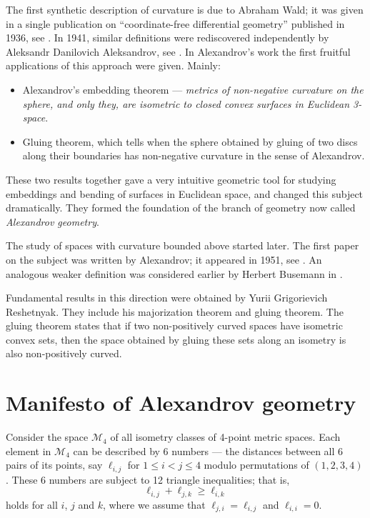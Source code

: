 The first synthetic description of curvature is due to Abraham Wald; 
it was given in a single publication  on ``coordinate-free differential geometry''
 published in 1936, see \cite{wald}.
In 1941, similar definitions were rediscovered independently by Aleksandr Danilovich Aleksandrov,
see \cite{alexandrov:def}.
In Alexandrov's work the first fruitful applications of this approach were given.
Mainly:
\begin{itemize}
\item Alexandrov's embedding theorem  --- 
\textit{metrics of non-negative curvature on the sphere, and only they, are isometric to closed convex surfaces in Euclidean 3-space}. 
\item Gluing theorem, which tells  when the sphere obtained by gluing of two discs along their boundaries has non-negative curvature in the sense of Alexandrov.
\end{itemize}
These two results together gave  a very intuitive geometric tool for studying  embeddings and bending of surfaces in  Euclidean space, and changed this subject dramatically.
They formed the foundation of the branch of geometry now called \emph{Alexandrov geometry}.

The study of  spaces with curvature bounded above started later.
The first paper on the subject was written by Alexandrov; it appeared in 1951, see \cite{alexandrov:strong-angle}.
An analogous weaker definition was considered earlier by Herbert Busemann in \cite{busemann-CBA}.

Fundamental results in this direction were obtained by Yurii Grigorievich Reshetnyak.
They include his majorization theorem and gluing theorem.
The gluing theorem states that if two non-positively curved spaces have isometric convex sets, then the space obtained by gluing these sets along an isometry is also non-positively curved.

\section*{Manifesto of Alexandrov geometry}


Consider the space $\mathcal{M}_4$ of all isometry classes of 4-point metric spaces.
Each element in $\mathcal{M}_4$ can be described by 6 numbers 
 --- the distances between all 6 pairs of its points, say $\ell_{i,j}$ for $1\le i< j\le 4$ modulo permutations of $(1,2,3,4)$.
These 6 numbers are subject to 12 triangle inequalities; that is,
\[\ell_{i,j}+\ell_{j,k}\ge \ell_{i,k}\]
holds for all $i$, $j$ and $k$, where we assume that $\ell_{j,i}=\ell_{i,j}$ and $\ell_{i,i}=0$.


